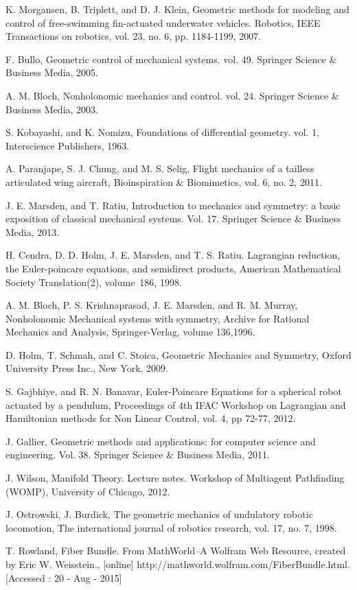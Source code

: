 \documentclass[letterpaper, 10 pt, conference]{ieeeconf}  \newcommand{\RN}[1]{\textup{\uppercase\expandafter{\romannumeral#1}}}
\begin{document}
\begin{thebibliography}{99}
 K. Morgansen, B. Triplett, and D. J. Klein, Geometric methods for modeling and control of free-swimming fin-actuated underwater vehicles. Robotics, IEEE Transactions on robotics, vol. 23, no. 6, pp. 1184-1199, 2007.

 F. Bullo, Geometric control of mechanical systems. vol. 49. Springer Science \& Business Media, 2005.

 A. M. Bloch, Nonholonomic mechanics and control. vol. 24. Springer Science \& Business Media, 2003.

 S. Kobayashi, and K. Nomizu, Foundations of differential geometry. vol. 1, Interscience Publishers, 1963.

 A. Paranjape, S. J. Chung, and M. S. Selig, Flight mechanics of a tailless articulated wing aircraft, Bioinspiration \& Biomimetics, vol. 6, no. 2, 2011.

 J. E. Marsden, and T. Ratiu, Introduction to mechanics and symmetry: a basic exposition of classical mechanical systems. Vol. 17. Springer Science \& Business Media, 2013.

 H. Cendra, D. D. Holm, J. E. Marsden, and T. S. Ratiu. Lagrangian reduction, the Euler-poincare equations, and semidirect products, American Mathematical Society Translation(2), volume~186, 1998.

A. M. Bloch, P. S. Krishnaprasad, J. E. Marsden, and R. M. Murray, Nonholonomic Mechanical systems with symmetry,
Archive for Rational Mechanics and Analysis, Springer-Verlag, volume 136,1996.

D. Holm, T. Schmah, and C. Stoica, Geometric Mechanics and Symmetry, Oxford University Press Inc., New York, 2009.

S. Gajbhiye, and R. N. Banavar, Euler-Poincare Equations for a spherical robot actuated by a pendulum, Proceedings of 4th IFAC Workshop on Lagrangian and Hamiltonian methods for Non Linear Control, vol. 4, pp 72-77, 2012.

J. Gallier, Geometric methods and applications: for computer science and engineering. Vol. 38. Springer Science \& Business Media, 2011.

J. Wilson, Manifold Theory. Lecture notes. Workshop of Multiagent Pathfinding (WOMP), University of Chicago, 2012.

J. Ostrowski, J. Burdick, The geometric mechanics of undulatory robotic locomotion, The international journal of robotics research, vol. 17, no. 7,  1998.

T. Rowland, Fiber Bundle. From MathWorld--A Wolfram Web Resource, created by Eric W. Weisstein., [online] http://mathworld.wolfram.com/FiberBundle.html. [Accessed : 20 - Aug - 2015]

\end{thebibliography}
\end{document}
